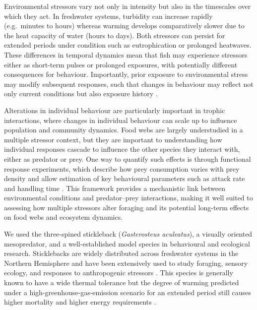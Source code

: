 \documentclass[ASNA,twocolumn]{USG} %
\begin{document}
Environmental stressors vary not only in intensity but also in the timescales over which they act. In freshwater systems, turbidity can increase rapidly (e.g.\ minutes to hours) whereas warming develops comparatively slower due to the heat capacity of water (hours to days). Both stressors can persist for extended periods under condition such as eutrophication or prolonged heatwaves. These differences in temporal dynamics mean that fish may experience stressors either as short-term pulses or prolonged exposures, with potentially different consequences for behaviour. Importantly, prior exposure to environmental stress may modify subsequent responses, such that changes in behaviour may reflect not only current conditions but also exposure history \citep{butzgeEarlyWarmingStress2021,chenPreviousExperienceAlters2022,martinPreviousOilExposure2020}.

Alterations in individual behaviour are particularly important in trophic interactions, where changes in individual behaviour can scale up to influence population and community dynamics. Food webs are largely understudied in a multiple stressor context, but they are important to understanding how individual responses cascade to influence the other species they interact with, either as predator or prey. One way to quantify such effects is through functional response experiments, which describe how prey consumption varies with prey density and allow estimation of key behavioural parameters such as attack rate and handling time \citep{hollingCharacteristicsSimpleTypes1959,hollingFunctionalResponseInvertebrate1966}. This framework provides a mechanistic link between environmental conditions and predator–prey interactions, making it well suited to assessing how multiple stressors alter foraging  and its potential long-term effects on food webs and ecosystem dynamics.

We used the three-spined stickleback (\textit{Gasterosteus aculeatus}), a visually oriented mesopredator, and a well-established model species in behavioural and ecological research. Sticklebacks are widely distributed across freshwater systems in the Northern Hemisphere \citep{fangWorldwidePhylogenyThreespined2018} and have been extensively used to study foraging, sensory ecology, and responses to anthropogenic stressors \citep[e.g.][]{haniEffectsChronicExposure2019d,huntingfordThreespinedSticklebacksGasterosteus2009, pottingerIndicesStressThreespined2011, pottingerStressResponseThreespined2013}. This species is generally known to have a wide thermal tolerance but the degree of warming predicted under a high-greenhouse-gas-emission scenario for an extended period still causes higher mortality and higher energy requirements \citep{devergneImpactsLongTermExposure2023}. 
\end{document}

